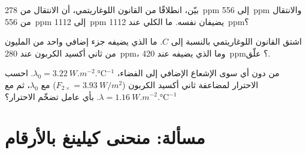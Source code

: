 \begin{exercise}[$\star\star\star$]\label{exo:g12:climate-change:13}
بيّن، انطلاقًا من القانون اللوغاريتمي، أن الانتقال من \qty{278}{ppm} إلى
\qty{556}{ppm} والانتقال من \qty{556}{ppm} إلى \qty{1112}{ppm} يضيفان 
نفسه. ما  الكلي عند \qty{1112}{ppm}؟
\end{exercise}

\begin{exercise}[$\star\star\star$]\label{exo:g12:climate-change:14}
اشتق القانون اللوغاريتمي بالنسبة إلى $C$. ما  الذي يضيفه
جزء إضافي واحد من المليون من ثاني أكسيد الكربون عند \qty{280}{ppm}، وما الذي يضيفه عند
\qty{420}{ppm}؟ علّق.
\end{exercise}

\begin{exercise}[$\star\star\star$]\label{exo:g12:climate-change:15}
من دون أي  سوى الإشعاع الإضافي إلى الفضاء،
$\lambda_0 = \qty{3.22}{W.m^{-2}.\degreeCelsius^{-1}}$. احسب الاحترار
لمضاعفة ثاني أكسيد الكربون ($F_{2\times} = \qty{3.93}{W/m^2}$) مع
$\lambda_0$، ثم مع $\lambda = \qty{1.16}{W.m^{-2}.\degreeCelsius^{-1}}$. بأي
عامل تضخّم  الاحترار؟
\end{exercise}

\section{مسألة: منحنى كيلينغ بالأرقام}

